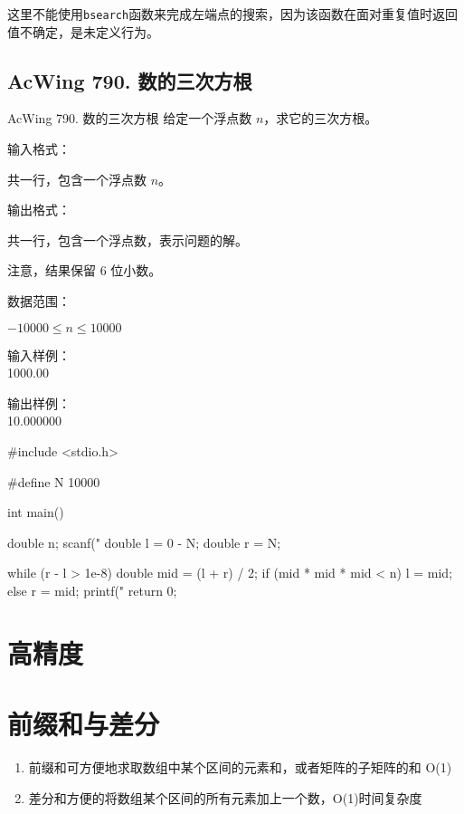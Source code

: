 \begin{exclamation}
    这里不能使用\lstinline{bsearch}函数来完成左端点的搜索，因为该函数在面对重复值时返回值不确定，是未定义行为。
\end{exclamation}

\subsection{AcWing 790. 数的三次方根}
\begin{titledbox}{AcWing 790. 数的三次方根}
    给定一个浮点数 $n$，求它的三次方根。

    输入格式：

    共一行，包含一个浮点数 $n$。

    输出格式：

    共一行，包含一个浮点数，表示问题的解。
    
    注意，结果保留 $6$ 位小数。
    
    数据范围：

    $-10000 \le n \le 10000$
    
    \begin{minipage}[t]{.5\textwidth}
        输入样例：\\
        1000.00
        \end{minipage}%
        \begin{minipage}[t]{.5\textwidth}
        输出样例：\\
        10.000000
    \end{minipage}
\end{titledbox}

\begin{mycpptwocol}[数的三次方根]
#include <stdio.h>

#define N 10000

int main()
{
    double n;
    scanf("%
    double l = 0 - N;
    double r = N;

    while (r - l > 1e-8) {
        double mid = (l + r) / 2;
        if (mid * mid * mid < n) {
            l = mid;
        } else {
            r = mid;
        }
    }
    printf("%
    return 0;
}
\end{mycpptwocol}

\section{高精度}

\section{前缀和与差分}
\begin{enumerate}
    \item 前缀和可方便地求取数组中某个区间的元素和，或者矩阵的子矩阵的和 O(1)
    \item 差分和方便的将数组某个区间的所有元素加上一个数，O(1)时间复杂度
\end{enumerate}

